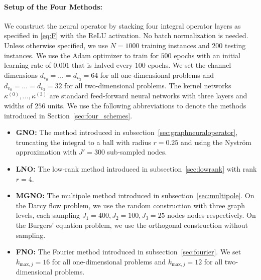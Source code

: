 \documentclass[twoside,12pt]{ctexart}
\begin{document}
\paragraph{Setup of the Four Methods:}
We construct the neural operator by stacking four integral operator layers as specified in \eqref{eq:F} with the ReLU activation. No batch normalization is needed. Unless otherwise specified, we use $N=1000$ training instances and $200$ testing instances. We use the
Adam optimizer to train for $500$ epochs with an initial learning rate of $0.001$ that is halved every $100$ epochs. We set the channel dimensions $d_{v_0} = \dots = d_{v_3} = 64$ for all one-dimensional problems and $d_{v_0} = \dots = d_{v_3} = 32$ for all two-dimensional problems. The kernel networks $\kappa^{(0)},\dots,\kappa^{(3)}$ are standard feed-forward neural networks with three layers and widths of $256$ units. We use the following abbreviations to denote the methods introduced in Section~\ref{sec:four_schemes}.
\begin{itemize}
    \item {\bf GNO:} The method introduced in subsection~\ref{sec:graphneuraloperator}, truncating the integral to a ball with radius \(r=0.25\) and using the Nystr\"om approximation with \(J' = 300\) sub-sampled nodes.
    \item {\bf LNO:} The low-rank method introduced in subsection~\ref{sec:lowrank} with rank $r=4$.
    \item {\bf MGNO:} The multipole method introduced in subsection~\ref{sec:multipole}. On  the Darcy flow problem, we use the random construction with three graph levels, each sampling $J_1 = 400, J_2 = 100, J_3 =25$ nodes nodes respectively. On the Burgers' equation problem, we use the orthogonal construction without sampling.
    \item {\bf FNO:} The Fourier method introduced in subsection~\ref{sec:fourier}. We set $k_{\text{max},j} = 16$ for all one-dimensional problems and $k_{\text{max},j} = 12$ for all two-dimensional problems.
\end{itemize}
\end{document}
